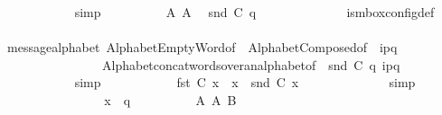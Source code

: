 \begin{isabellebody}
\ \ \ \ \ \ \ \ \ \ \isamarkupfalse%
\ simp\isanewline
\ \ \ \ \ \ \ \ \isamarkupfalse%
\ A{}\ A{}\ \isamarkupfalse%
\ {\isachardoublequoteopen}snd\ {\isacharparenleft}{\kern0pt}C{}\ q{\isacharparenright}{\kern0pt}\ {\isasymin}\ {\isasymM}\isactrlsup {\isacharasterisk}{\kern0pt}{\isachardoublequoteclose}\isanewline
\ \ \ \ \ \ \ \ \ \ \isamarkupfalse%
\ is{\isacharunderscore}{\kern0pt}mbox{\isacharunderscore}{\kern0pt}config{\isacharunderscore}{\kern0pt}def\isanewline
\ \ \ \ \ \ \ \ \ \ \isamarkupfalse%
\ message{\isacharunderscore}{\kern0pt}alphabet\ Alphabet{\isachardot}{\kern0pt}EmptyWord{\isacharbrackleft}{\kern0pt}of\ {\isasymM}{\isacharbrackright}{\kern0pt}\ Alphabet{\isachardot}{\kern0pt}Composed{\isacharbrackleft}{\kern0pt}of\ {\isasymM}\ {\isachardoublequoteopen}i\isactrlbsup p{\isasymrightarrow}q\isactrlesup {\isachardoublequoteclose}\ {\isasymepsilon}{\isacharbrackright}{\kern0pt}\isanewline
\ \ \ \ \ \ \ \ \ \ \ \ \ \ \ \ Alphabet{\isachardot}{\kern0pt}concat{\isacharunderscore}{\kern0pt}words{\isacharunderscore}{\kern0pt}over{\isacharunderscore}{\kern0pt}an{\isacharunderscore}{\kern0pt}alphabet{\isacharbrackleft}{\kern0pt}of\ {\isasymM}\ {\isachardoublequoteopen}snd\ {\isacharparenleft}{\kern0pt}C{}\ q{\isacharparenright}{\kern0pt}{\isachardoublequoteclose}\ {\isachardoublequoteopen}{\isacharbrackleft}{\kern0pt}i\isactrlbsup p{\isasymrightarrow}q\isactrlesup {\isacharbrackright}{\kern0pt}{\isachardoublequoteclose}{\isacharbrackright}{\kern0pt}\isanewline
\ \ \ \ \ \ \ \ \ \ \isamarkupfalse%
\ simp\isanewline
\ \ \ \ \ \ \ \ \isamarkupfalse%
\ \isamarkupfalse%
\ {\isachardoublequoteopen}fst\ {\isacharparenleft}{\kern0pt}C{}\ x{\isacharparenright}{\kern0pt}\ {\isasymin}\ {\isasymS}{\isacharparenleft}{\kern0pt}x{\isacharparenright}{\kern0pt}\ {\isasymand}\ snd\ {\isacharparenleft}{\kern0pt}C{}\ x{\isacharparenright}{\kern0pt}\ {\isasymin}\ {\isasymM}\isactrlsup {\isacharasterisk}{\kern0pt}{\isachardoublequoteclose}\isanewline
\ \ \ \ \ \ \ \ \ \ \isamarkupfalse%
\ simp\isanewline
\ \ \ \ \ \ \isamarkupfalse%
\isanewline
\ \ \ \ \ \ \ \ \isamarkupfalse%
\ {\isachardoublequoteopen}x\ {\isasymnoteq}\ q{\isachardoublequoteclose}\isanewline
\ \ \ \ \ \ \ \ \isamarkupfalse%
\ A{}\ A{}\ B\ \isamarkupfalse%

\end{isabellebody}
